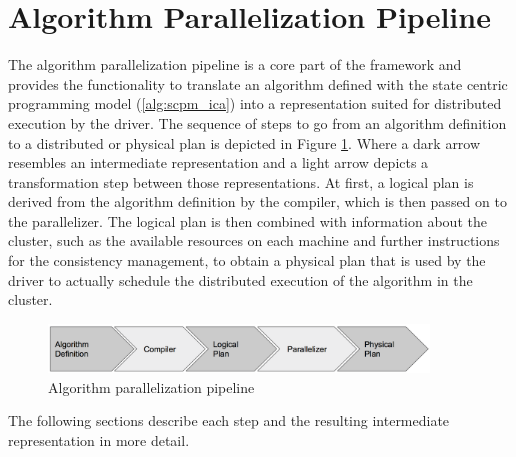 \section{Algorithm Parallelization Pipeline}
\label{s:algo_parallel_pipeline}
The algorithm parallelization pipeline is a core part of the framework and provides the functionality to translate an algorithm defined with the state centric programming model (\ref{alg:scpm_ica}) into a representation suited for distributed execution by the driver.
The sequence of steps to go from an algorithm definition to a distributed or physical plan is depicted in Figure \ref{fig:parallel_pipeline}.
Where a dark arrow resembles an intermediate representation and a light arrow depicts a transformation step between those representations.
At first, a logical plan is derived from the algorithm definition by the compiler, which is then passed on to the parallelizer.
The logical plan is then combined with information about the cluster, such as the available resources on each machine and further instructions for the consistency management, to obtain a physical plan that is used by the driver to actually schedule the distributed execution of the algorithm in the cluster.
\begin{figure}[ht]
\centering
\includegraphics[width=0.9\textwidth]{img/algo_parallel_pipeline.png}
\caption{Algorithm parallelization pipeline}
\label{fig:parallel_pipeline}
\end{figure}
The following sections describe each step and the resulting intermediate representation in more detail.

